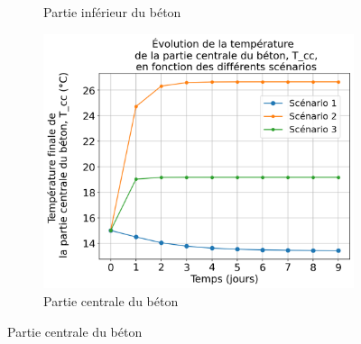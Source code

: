\documentclass[12pt]{article}
\begin{document}
\begin{figure}
\begin{subfigure}{0.48\textwidth}
                \caption{Partie inférieur du béton} 
                \label{fig:Tc2}
            \end{subfigure}
            \begin{subfigure}{0.48\textwidth}
                \centering
                \includegraphics[width=1\linewidth]{Rapport/figures/T_cc.png}
                \caption{Partie centrale du béton} 
                \label{fig:Tcc}
            \end{subfigure}
            

\end{figure}
\end{document}

